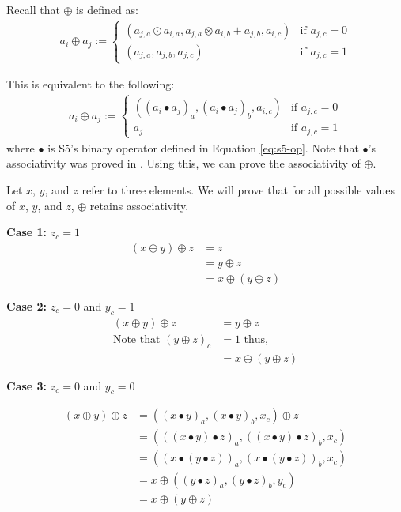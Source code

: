 \documentclass{article}
\newcommand{\oldop}{\bullet}
\newcommand{\newop}{\oplus}
\begin{document}
Recall that $\newop$ is defined as:
\begin{align}
a_i \newop a_j := 
\begin{cases}
(a_{j,a} \odot a_{i,a}, a_{j,a} \otimes a_{i, b} + a_{j, b}, a_{i, c}) & \text{if $a_{j,c}=0$}\\
(a_{j,a}, a_{j,b}, a_{j,c}) & \text{if $a_{j,c}=1$} \nonumber
\end{cases}
\end{align}

This is equivalent to the following:
\begin{align}
a_i \newop a_j := 
\begin{cases}
((a_i \oldop a_j)_a, (a_i \oldop a_j)_b, a_{i, c}) & \text{if $a_{j,c}=0$}\\
a_j & \text{if $a_{j,c}=1$} \nonumber
\end{cases}
\end{align}
where $\oldop$ is S5's binary operator defined in Equation \ref{eq:s5-op}. Note that $\oldop$'s associativity was proved in \citet{smith2022simplified}. Using this, we can prove the associativity of $\newop$. 

Let $x$, $y$, and $z$ refer to three elements. We will prove that for all possible values of $x$, $y$, and $z$, $\newop$ retains associativity.

\textbf{Case 1:} $z_c = 1$ 
\begin{align}
(x \newop y) \newop z &= z \\
&= y \newop z \\
&= x \newop (y \newop z)
\end{align}

\textbf{Case 2:} $z_c = 0$ and $y_c = 1$
\begin{align}
(x \newop y) \newop z &= y \newop z \\
 \text{Note that } (y\newop z)_c &= 1 \text{ thus,} \\
&= x \newop (y \newop z)
\end{align}

\textbf{Case 3:} $z_c = 0$ and $y_c = 0$

\begin{align}
(x \newop y) \newop z &= ((x \oldop y)_a, (x\oldop y)_b, x_c)\newop z \\
&= (((x\oldop y) \oldop z)_a, ((x\oldop y) \oldop z)_b, x_c) \\
&= ((x \oldop (y \oldop z))_a, (x \oldop (y \oldop z))_b, x_c) \\
&= x \newop ((y \oldop z)_a, (y \oldop z)_b, y_c) \\
&= x \newop (y \newop z)
\end{align}
\end{document}
